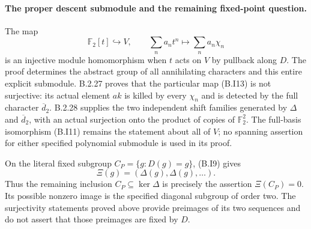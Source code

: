\paragraph{The proper descent submodule and the remaining fixed-point question.}
The map
\[
 \mathbb F_2[t]\hookrightarrow V,\qquad
       \sum_n a_nt^n\longmapsto\sum_n a_n\chi_n
                                                        \tag{B.I13}
\]
is an injective module homomorphism when $t$ acts on $V$
by pullback along $D$.  The proof determines the abstract
group of all annihilating characters and this entire
explicit submodule.  B.2.27 proves that the particular
map (B.I13) is not surjective: its actual element $ak$
is killed by every $\chi_n$ and is detected by the full
character $\overline d_2$.  B.2.28 supplies the two
independent shift families generated by $\Delta$ and
$\overline d_2$, with an actual surjection onto the
product of copies of $\mathbb F_2^2$.  The full-basis
isomorphism (B.I11) remains the statement about all of
$V$; no spanning assertion for either specified
polynomial submodule is used in its proof.

On the literal fixed subgroup $C_P=\{g:D(g)=g\}$,
(B.I9) gives
\[
 \Xi(g)=(\Delta(g),\Delta(g),\ldots).
                                                        \tag{B.I14}
\]
Thus the remaining inclusion $C_P\subseteq\ker\Delta$
is precisely the assertion $\Xi(C_P)=0$.  Its possible
nonzero image is the specified diagonal subgroup of
order two.  The surjectivity statements proved above
provide preimages of its two sequences and do not
assert that those preimages are fixed by $D$.
